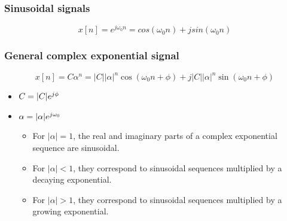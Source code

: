     \subsubsection{Sinusoidal signals}
    \begin{definition}
        \begin{equation}
            x[n] = e^{j \omega_0 n} = cos(\omega_0 n) + j sin(\omega_0 n)
        \end{equation}
    \end{definition}

    \subsubsection{General complex exponential signal}
    \begin{definition}
        \begin{equation}
            x[n] = C \alpha^n = |C| |\alpha|^n \cos(\omega_0 n + \phi) + j |C| |\alpha|^n \sin(\omega_0 n + \phi)
        \end{equation}
        \begin{itemize}
            \item $C = \abs{C} e^{j\phi}$
            \item $\alpha = \abs{\alpha} e^{j\omega_0 }$
            \begin{itemize}
                \item For \(|\alpha| = 1\), the real and imaginary parts of a complex exponential sequence are sinusoidal.
                \item For \(|\alpha| < 1\), they correspond to sinusoidal sequences multiplied by a decaying exponential.
                \item For \(|\alpha| > 1\), they correspond to sinusoidal sequences multiplied by a growing exponential.
            \end{itemize}
            
        \end{itemize}
    \end{definition}

